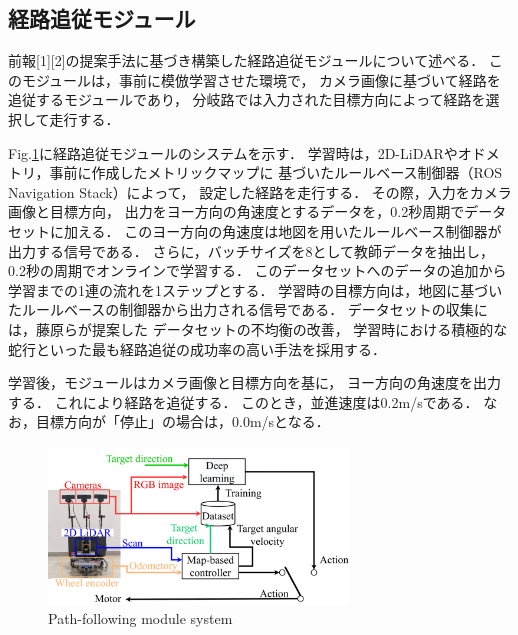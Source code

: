 \documentclass{sice-si}
\begin{document}
\subsection{経路追従モジュール}
前報[1][2]の提案手法に基づき構築した経路追従モジュールについて述べる．
このモジュールは，事前に模倣学習させた環境で，
カメラ画像に基づいて経路を追従するモジュールであり，
分岐路では入力された目標方向によって経路を選択して走行する．
\par
Fig.\ref{fig:learning}に経路追従モジュールのシステムを示す．
学習時は，2D-LiDARやオドメトリ，事前に作成したメトリックマップに
基づいたルールベース制御器（ROS Navigation Stack\cite{ros-navigation}）によって，
設定した経路を走行する．
その際，入力をカメラ画像と目標方向，
出力をヨー方向の角速度とするデータを，0.2秒周期でデータセットに加える．
このヨー方向の角速度は地図を用いたルールベース制御器が出力する信号である．
さらに，バッチサイズを8として教師データを抽出し，
0.2秒の周期でオンラインで学習する．
このデータセットへのデータの追加から学習までの1連の流れを1ステップとする．
学習時の目標方向は，地図に基づいたルールベースの制御器から出力される信号である．
データセットの収集には，藤原ら\cite{fujiwara2023}が提案した
データセットの不均衡の改善，
学習時における積極的な蛇行といった最も経路追従の成功率の高い手法を採用する．
\par
学習後，モジュールはカメラ画像と目標方向を基に，
ヨー方向の角速度を出力する．
これにより経路を追従する．
このとき，並進速度は0.2m/sである．
なお，目標方向が「停止」の場合は，0.0m/sとなる．
\begin{figure}[htbp]
    \centering
     \includegraphics[width=80mm]{./figs/system_learning.pdf}
     \caption{Path-following module system}\label{fig:learning}
\end{figure}
\end{document}
